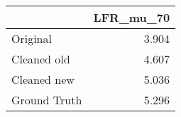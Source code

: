 \begin{tabular}{lr}
\toprule
{} & LFR_mu_70 \\
\midrule
Original     &     3.904 \\
Cleaned old  &     4.607 \\
Cleaned new  &     5.036 \\
Ground Truth &     5.296 \\
\bottomrule
\end{tabular}

